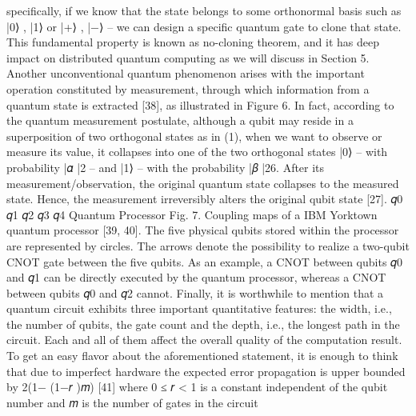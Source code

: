 specifically, if we know that the state belongs to some orthonormal basis such as {|0⟩ , |1⟩} or {|+⟩ , |−⟩} – we can design a specific quantum gate to clone that state. This fundamental property is known as no-cloning theorem, and it has deep impact on distributed quantum computing as we will discuss in Section 5. Another unconventional quantum phenomenon arises with the important operation constituted by measurement, through which information from a quantum state is extracted [38], as illustrated in Figure 6. In fact, according to the quantum measurement postulate, although a qubit may reside in a superposition of two orthogonal states as in (1), when we want to observe or measure its value, it collapses into one of the two orthogonal states |0⟩ – with probability |𝛼 |2 – and |1⟩ – with the probability |𝛽 |26. After its measurement/observation, the original quantum state collapses to the measured state. Hence, the measurement irreversibly alters the original qubit state [27]. 𝑞0 𝑞1 𝑞2 𝑞3 𝑞4 Quantum Processor Fig. 7. Coupling maps of a IBM Yorktown quantum processor [39, 40]. The five physical qubits stored within the processor are represented by circles. The arrows denote the possibility to realize a two-qubit CNOT gate between the five qubits. As an example, a CNOT between qubits 𝑞0 and 𝑞1 can be directly executed by the quantum processor, whereas a CNOT between qubits 𝑞0 and 𝑞2 cannot. Finally, it is worthwhile to mention that a quantum circuit exhibits three important quantitative features: the width, i.e., the number of qubits, the gate count and the depth, i.e., the longest path in the circuit. Each and all of them affect the overall quality of the computation result. To get an easy flavor about the aforementioned statement, it is enough to think that due to imperfect hardware the expected error propagation is upper bounded by 2(1− (1−𝑟 )𝑚) [41] where 0 ≤ 𝑟 < 1 is a constant independent of the qubit number and 𝑚 is the number of gates in the circuit

